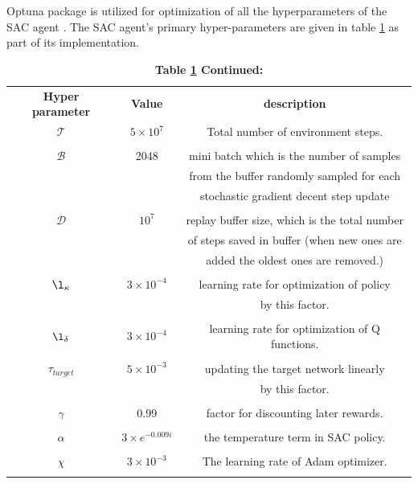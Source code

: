Optuna package is utilized for optimization of all the hyperparameters of the SAC agent \cite{optuna_2019}. The SAC agent's primary hyper-parameters are given in table \ref{table of hyperparameters} as part of its implementation.
\begin{longtable}{c|c|c} 
	\caption {Hyper parameters of SAC agent.}\label{table of hyperparameters}\\\toprule
	\endfirsthead
	\caption* {\textbf{Table \ref{table of hyperparameters} Continued:} }\\\toprule
	\endhead
	\endfoot
	\bottomrule
	\endlastfoot
		\textbf{Hyper parameter} & \textbf{Value} & \textbf{description}  \\ \hline \hline
$\mathcal{T}$ & $5\times10^{7}$ &  Total number of environment steps.\\&& \\ \hline
$\mathcal{B}$ & 2048  & mini batch which is the number of samples\\&& from the buffer randomly sampled for each\\&& stochastic gradient decent step update\\&& \\ \hline
$\mathcal{D}$ & $10^7$  &replay buffer size, which is the total number\\&& of steps saved in buffer (when new ones are\\&& added the oldest ones are removed.)\\&& \\ \hline
$\l_{\kappa}$  & $3\times 10^{-4}$  & learning rate for optimization of policy \\&& by this factor.\\&& \\ \hline
$\l_{\delta}$  & $3\times 10^{-4}$  & learning rate for optimization of Q functions.\\&& \\ \hline
$\tau_{target}$  & $5\times 10^{-3}$  & updating the target network linearly\\&& by this factor.\\&& \\ \hline
$\gamma$  & 0.99  &  factor for discounting later rewards.\\&& \\ \hline
$\alpha$  & $3\times e^{-0.009i}$ & the temperature term in SAC policy.\\&& \\ \hline
$\chi$  & $3\times 10^{-3}$  & The learning rate of Adam optimizer.\\&& \\ \hline

\end{longtable}
